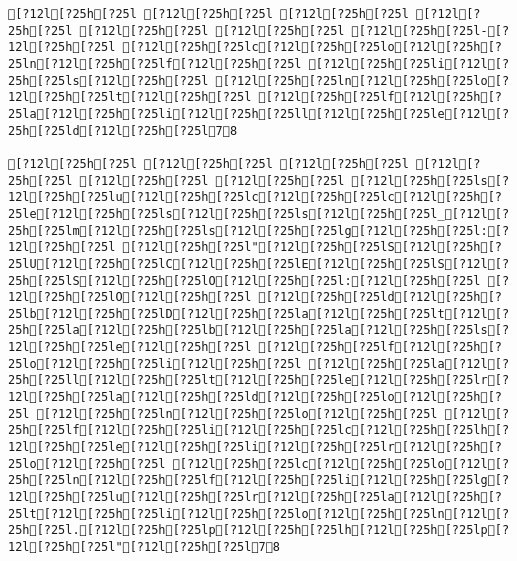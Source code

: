 \documentclass{scrartcl}
\begin{document}
\begin{Verbatim}
[?12l[?25h[?25l [?12l[?25h[?25l [?12l[?25h[?25l [?12l[?25h[?25l [?12l[?25h[?25l [?12l[?25h[?25l [?12l[?25h[?25l-[?12l[?25h[?25l [?12l[?25h[?25lc[?12l[?25h[?25lo[?12l[?25h[?25ln[?12l[?25h[?25lf[?12l[?25h[?25l [?12l[?25h[?25li[?12l[?25h[?25ls[?12l[?25h[?25l [?12l[?25h[?25ln[?12l[?25h[?25lo[?12l[?25h[?25lt[?12l[?25h[?25l [?12l[?25h[?25lf[?12l[?25h[?25la[?12l[?25h[?25li[?12l[?25h[?25ll[?12l[?25h[?25le[?12l[?25h[?25ld[?12l[?25h[?25l78

[?12l[?25h[?25l [?12l[?25h[?25l [?12l[?25h[?25l [?12l[?25h[?25l [?12l[?25h[?25l [?12l[?25h[?25l [?12l[?25h[?25ls[?12l[?25h[?25lu[?12l[?25h[?25lc[?12l[?25h[?25lc[?12l[?25h[?25le[?12l[?25h[?25ls[?12l[?25h[?25ls[?12l[?25h[?25l_[?12l[?25h[?25lm[?12l[?25h[?25ls[?12l[?25h[?25lg[?12l[?25h[?25l:[?12l[?25h[?25l [?12l[?25h[?25l"[?12l[?25h[?25lS[?12l[?25h[?25lU[?12l[?25h[?25lC[?12l[?25h[?25lE[?12l[?25h[?25lS[?12l[?25h[?25lS[?12l[?25h[?25lO[?12l[?25h[?25l:[?12l[?25h[?25l [?12l[?25h[?25lO[?12l[?25h[?25l [?12l[?25h[?25ld[?12l[?25h[?25lb[?12l[?25h[?25lD[?12l[?25h[?25la[?12l[?25h[?25lt[?12l[?25h[?25la[?12l[?25h[?25lb[?12l[?25h[?25la[?12l[?25h[?25ls[?12l[?25h[?25le[?12l[?25h[?25l [?12l[?25h[?25lf[?12l[?25h[?25lo[?12l[?25h[?25li[?12l[?25h[?25l [?12l[?25h[?25la[?12l[?25h[?25ll[?12l[?25h[?25lt[?12l[?25h[?25le[?12l[?25h[?25lr[?12l[?25h[?25la[?12l[?25h[?25ld[?12l[?25h[?25lo[?12l[?25h[?25l [?12l[?25h[?25ln[?12l[?25h[?25lo[?12l[?25h[?25l [?12l[?25h[?25lf[?12l[?25h[?25li[?12l[?25h[?25lc[?12l[?25h[?25lh[?12l[?25h[?25le[?12l[?25h[?25li[?12l[?25h[?25lr[?12l[?25h[?25lo[?12l[?25h[?25l [?12l[?25h[?25lc[?12l[?25h[?25lo[?12l[?25h[?25ln[?12l[?25h[?25lf[?12l[?25h[?25li[?12l[?25h[?25lg[?12l[?25h[?25lu[?12l[?25h[?25lr[?12l[?25h[?25la[?12l[?25h[?25lt[?12l[?25h[?25li[?12l[?25h[?25lo[?12l[?25h[?25ln[?12l[?25h[?25l.[?12l[?25h[?25lp[?12l[?25h[?25lh[?12l[?25h[?25lp[?12l[?25h[?25l"[?12l[?25h[?25l78


\end{Verbatim}
\end{document}
